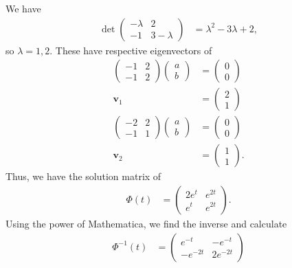 \documentclass[10pt]{mypackage}
\begin{document}
\begin{solution}[8.3, Problem 16]
  We have
  \begin{align*}
    \det \begin{pmatrix}-\lambda & 2 \\ -1 & 3-\lambda\end{pmatrix} &= \lambda^2 - 3\lambda + 2,
  \end{align*}
  so $\lambda = 1,2$. These have respective eigenvectors of
  \begin{align*}
    \begin{pmatrix}-1 & 2 \\ -1 & 2\end{pmatrix} \begin{pmatrix}a\\b\end{pmatrix} &= \begin{pmatrix}0\\0\end{pmatrix}\\
    \mathbf{v}_1 &= \begin{pmatrix}2\\1\end{pmatrix}\\
    \begin{pmatrix}-2 & 2 \\ -1 & 1\end{pmatrix} \begin{pmatrix}a\\b\end{pmatrix} &= \begin{pmatrix}0\\0\end{pmatrix}\\
    \mathbf{v}_2 &= \begin{pmatrix}1\\1\end{pmatrix}.
  \end{align*}
  Thus, we have the solution matrix of
  \begin{align*}
    \Phi(t) &= \begin{pmatrix}2e^{t} & e^{2t} \\ e^{t} & e^{2t}\end{pmatrix}.
  \end{align*}
  Using the power of Mathematica, we find the inverse and calculate
  \begin{align*}
    \Phi^{-1}(t) &= \begin{pmatrix}e^{-t} & -e^{-t} \\ -e^{-2t} & 2e^{-2t}\end{pmatrix}\\

\end{align*}
\end{solution}
\end{document}
